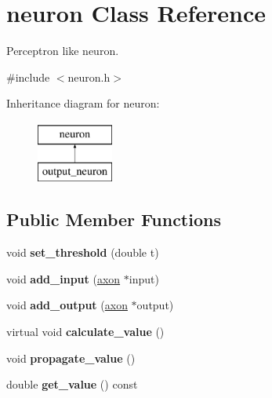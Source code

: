 \hypertarget{classneuron}{}\section{neuron Class Reference}
\label{classneuron}


Perceptron like neuron.  




{\ttfamily \#include $<$neuron.\+h$>$}

Inheritance diagram for neuron\+:\begin{figure}[H]
\begin{center}
\leavevmode
\includegraphics[height=2.000000cm]{classneuron}
\end{center}
\end{figure}
\subsection*{Public Member Functions}
\begin{DoxyCompactItemize}
\item 
\mbox{\label{classneuron_afda4f1ba2c739a1c03c407838d1c336a}} 
void {\bfseries set\+\_\+threshold} (double t)
\item 
\mbox{\label{classneuron_a2a88d55500f17c28ae0c262fd5c627f2}} 
void {\bfseries add\+\_\+input} (\mbox{\hyperlink{classaxon}{axon}} $\ast$input)
\item 
\mbox{\label{classneuron_a5718f629f5bfe73a41f0e3d2f4b6abf0}} 
void {\bfseries add\+\_\+output} (\mbox{\hyperlink{classaxon}{axon}} $\ast$output)
\item 
\mbox{\label{classneuron_a49f9bb4a8ef9fb8220c66d2ee4752760}} 
virtual void {\bfseries calculate\+\_\+value} ()
\item 
\mbox{\label{classneuron_a697f1ae7d0cb97e66b2382b1f01e47ea}} 
void {\bfseries propagate\+\_\+value} ()
\item 
\mbox{\label{classneuron_a1f560b8ccb0240439df55ac69758ff3d}} 
double {\bfseries get\+\_\+value} () const
\end{DoxyCompactItemize}
